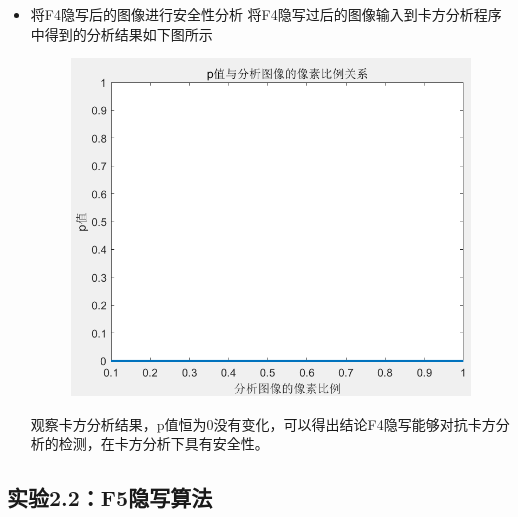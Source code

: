 \documentclass[a4paper,11pt,UTF8]{ctexart}
\newcommand{\bottomcaption}{%
\setlength{\abovecaptionskip}{6pt}%
\setlength{\belowcaptionskip}{6pt}%
\caption}
\newcommand{\xiaowuhao}{\fontsize{9pt}{\baselineskip}\selectfont}   %
\begin{document}
\begin{itemize}
      \item 将F4隐写后的图像进行安全性分析
        将F4隐写过后的图像输入到卡方分析程序中得到的分析结果如下图所示
        \begin{figure}[H]
          \centering
          \includegraphics[width=11cm]{k2_F4.png}
          \bottomcaption{\xiaowuhao{对F4隐写后的结果进行卡方分析}}
        \end{figure}
        观察卡方分析结果，p值恒为0没有变化，可以得出结论F4隐写能够对抗卡方分析的检测，在卡方分析下具有安全性。
        
    \end{itemize}
\newpage
  \subsection{实验2.2：F5隐写算法}
\end{document}

